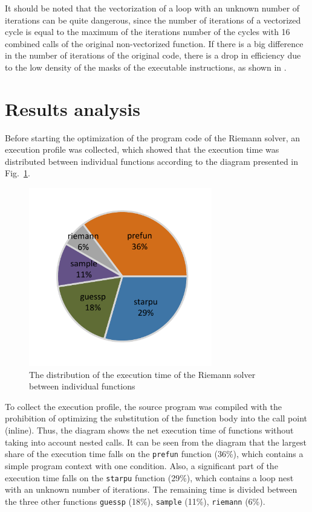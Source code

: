 \documentclass[utf8,english]{psta}%
\begin{document}
It should be noted that the vectorization of a loop with an unknown number of iterations can be quite dangerous, since the number of iterations of a vectorized cycle is equal to the maximum of the iterations number of the cycles with 16 combined calls of the original non-vectorized function.
If there is a big difference in the number of iterations of the original code, there is a drop in efficiency due to the low density of the masks of the executable instructions, as shown in \cite{RybTelShabLoopsVect}.

\section{Results analysis}

Before starting the optimization of the program code of the Riemann solver, an execution profile was collected, which showed that the execution time was distributed between individual functions according to the diagram presented in Fig.~\ref{pic:exe_prof}.

\begin{figure}
\includegraphics[width=8cm]{pics/pic_exe_prof}
\caption{The distribution of the execution time of the Riemann solver between individual functions}
\label{pic:exe_prof}
\end{figure}

To collect the execution profile, the source program was compiled with the prohibition of optimizing the substitution of the function body into the call point (inline).
Thus, the diagram shows the net execution time of functions without taking into account nested calls.
It can be seen from the diagram that the largest share of the execution time falls on the \texttt{prefun} function (36\%), which contains a simple program context with one condition.
Also, a significant part of the execution time falls on the \texttt{starpu} function (29\%), which contains a loop nest with an unknown number of iterations.
The remaining time is divided between the three other functions \texttt{guessp} (18\%), \texttt{sample} (11\%), \texttt{riemann} (6\%).
\end{document}
